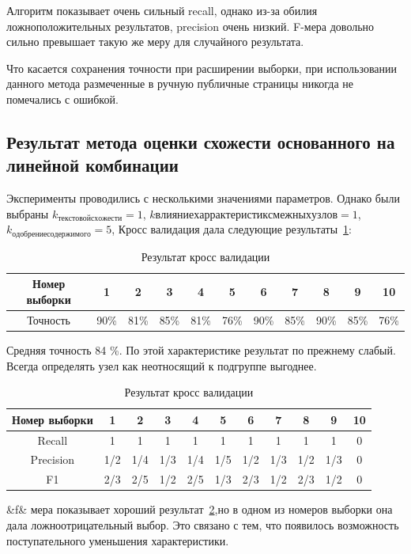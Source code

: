 \documentclass[annotation,times,page4]{itmo-student-thesis}
\begin{document}
Алгоритм показывает очень сильный recall, однако из-за обилия ложноположительных результатов, precision очень низкий. F-мера довольно сильно превышает такую же меру для случайного результата.
 

Что касается сохранения точности при расширении выборки, при использовании данного метода размеченные в ручную публичные страницы никогда не помечались с ошибкой.

\subsection{Результат метода оценки схожести основанного на линейной комбинации}
Эксперименты проводились с несколькими значениями параметров. Однако были выбраны $k_{текстовой схожести} = 1$, $k{влияние харрактеристик смежных узлов}=1$, $k_{одобрение содержимого}=5$,  
Кросс валидация дала следующие результаты~\ref{tab1}:
\begin{table}[!h]
\caption{Результат кросс валидации}\label{tab1}
\centering
\begin{tabular}{|*{11}{c|}}\hline
Номер выборки & 1 & 2 & 3 & 4 & 5 & 6 & 7 & 8 & 9 & 10 \\\hline
Точность  & 90\% & 81\% & 85\% & 81\% & 76\% & 90\% & 85\% & 90\% & 85\% & 76\% \\\hline
\end{tabular}
\end{table}

Средняя точность 84 \%. По этой характеристике результат по прежнему слабый. Всегда определять узел как неотносящий к подгруппе выгоднее.

\begin{table}[!h]
\caption{Результат кросс валидации}\label{tab4}
\centering
\begin{tabular}{|*{11}{c|}}\hline
Номер выборки & 1 & 2 & 3 & 4 & 5 & 6 & 7 & 8 & 9 & 10 \\\hline
Recall  & 1& 1& 1& 1& 1& 1& 1& 1& 1& 0\\\hline
Precision & 1/2 & 1/4 & 1/3 & 1/4 & 1/5 & 1/2 & 1/3 & 1/2 & 1/3 & 0\\\hline
F1        & 2/3 & 2/5 & 1/2 & 2/5 & 1/3 & 2/3 & 1/2 & 2/3 & 1/2 & 0 \\\hline

\end{tabular}
\end{table}

&f& мера показывает хороший результат~\ref{tab4},но в одном из номеров выборки она дала ложноотрицательный выбор. Это связано с тем, что появилось возможность поступательного уменьшения характеристики.
\end{document}
